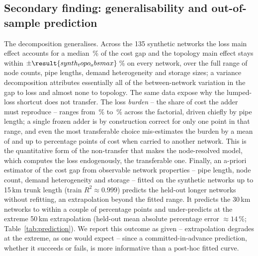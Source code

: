 \documentclass[a4paper,fleqn]{cas-dc}
\begin{document}
\subsection{Secondary finding: generalisability and out-of-sample prediction}
\label{subsec:generalis}
The decomposition generalises. Across the 135 synthetic networks the loss main effect
accounts for a median \,\% of the cost gap and the topology main
effect stays within $\pm\result{synth_topo_absmax}$\,\% on every network, over the full range of
node counts, pipe lengths, demand heterogeneity and storage sizes; a variance decomposition
attributes essentially all of the between-network variation in the gap to loss and almost none
to topology. The same data expose why the lumped-loss shortcut does not transfer. The loss
\emph{burden} -- the share of cost the adder must reproduce -- ranges from
\,\% to \,\% across the factorial, driven
chiefly by pipe length; a single frozen adder is by construction correct for only one point in
that range, and even the most transferable choice mis-estimates the burden by a mean of
 and up to  percentage points of cost
when carried to another network. This is the quantitative form of the non-transfer that makes
the node-resolved model, which computes the loss endogenously, the transferable one. Finally,
an a-priori estimator of the cost gap from observable network properties -- pipe length, node
count, demand heterogeneity and storage -- fitted on the synthetic networks up to 15\,km trunk
length (train $R^2\approx0.999$) predicts the held-out longer networks without refitting, an
extrapolation beyond the fitted range. It predicts the 30\,km networks to within a couple of
percentage points and under-predicts at the extreme 50\,km extrapolation (held-out mean absolute
percentage error $\approx14$\,\%; Table~\ref{tab:prediction}). We report this outcome as given --
extrapolation degrades at the extreme, as one would expect -- since a committed-in-advance
prediction, whether it succeeds or fails, is more informative than a post-hoc fitted curve.
\end{document}

